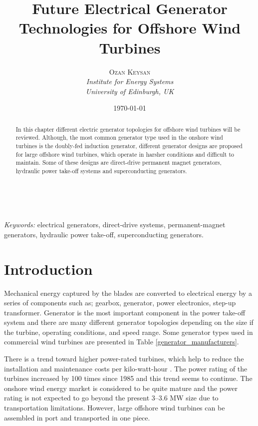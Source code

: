 \documentclass[a4paper, 11pt]{article} %
\title{\textbf{Future Electrical Generator Technologies for Offshore Wind Turbines}} %
\author{\textsc{Ozan Keysan} %
\\{\textit{Institute for Energy  Systems\\ University of Edinburgh, UK}}} %
\date{\today} %
\makeatletter
\renewcommand{\maketitle}{ %
\begin{flushright} %
{\LARGE\@title} %

\vspace{50pt} %

{\large\@author} %
\\\@date %

\vspace{40pt} %
\end{flushright}
}
\makeatother
\begin{document}
\maketitle %

\begin{abstract}

In this chapter different electric generator topologies for offshore wind turbines will be reviewed. Although, the most common generator type used in the onshore wind turbines is the doubly-fed induction generator, different generator designs are proposed for large offshore wind turbines, which operate in harsher conditions and difficult to maintain. Some of these designs are direct-drive permanent magnet generators, hydraulic power take-off systems and superconducting generators.

\end{abstract}

\hspace*{3,6mm}\textit{Keywords:} electrical generators, direct-drive systems, permanent-magnet generators, hydraulic power take-off, superconducting generators. %

\vspace{30pt} %


\section*{Introduction}

Mechanical energy captured by the blades are converted to electrical energy by a series of components such as; gearbox, generator, power electronics, step-up transformer. Generator is the most important component in the power take-off system and there are many different generator topologies depending on the size if the turbine, operating conditions, and speed range. Some generator types used in commercial wind turbines are presented in Table \ref{generator_manufacturers}. 

There is a trend toward higher power-rated turbines, which help to reduce the installation and maintenance costs per kilo-watt-hour \cite{Bang2008}. The power rating of the turbines increased by 100 times since 1985 and this trend seems to continue. The onshore wind energy market is considered to be quite mature and the power rating is not expected to go beyond the present 3--3.6 MW size due to transportation limitations. 
However, large offshore wind turbines can be assembled in port and transported in one piece.
\end{document}
